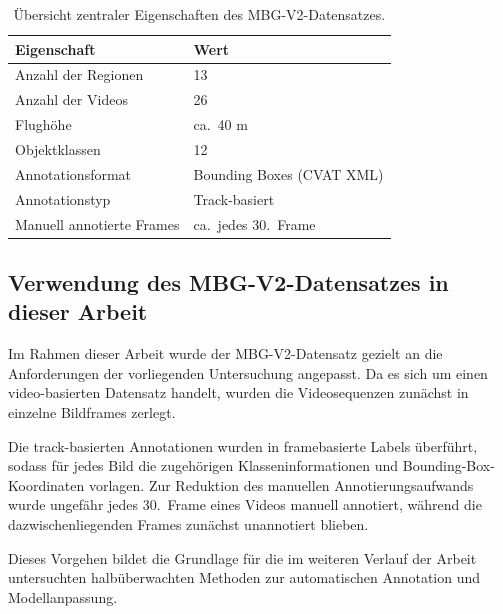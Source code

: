 \begin{table}[H]
    \centering
    \caption{Übersicht zentraler Eigenschaften des MBG-V2-Datensatzes.}
    \label{tab:mbgv2_overview}
    \begin{tabular}{ll}
        \toprule
        \textbf{Eigenschaft}      & \textbf{Wert}             \\
        \midrule
        Anzahl der Regionen       & 13                        \\
        Anzahl der Videos         & 26                        \\
        Flughöhe                  & ca.\ 40 m                 \\
        Objektklassen             & 12                        \\
        Annotationsformat         & Bounding Boxes (CVAT XML) \\
        Annotationstyp            & Track-basiert             \\
        Manuell annotierte Frames & ca.\ jedes 30.~Frame      \\
        \bottomrule
    \end{tabular}
\end{table}

\subsection{Verwendung des MBG-V2-Datensatzes in dieser Arbeit}

Im Rahmen dieser Arbeit wurde der MBG-V2-Datensatz gezielt an die Anforderungen
der vorliegenden Untersuchung angepasst. Da es sich um einen video-basierten
Datensatz handelt, wurden die Videosequenzen zunächst in einzelne Bildframes
zerlegt.

Die track-basierten Annotationen wurden in framebasierte Labels überführt,
sodass für jedes Bild die zugehörigen Klasseninformationen und
Bounding-Box-Koordinaten vorlagen. Zur Reduktion des manuellen
Annotierungsaufwands wurde ungefähr jedes 30.~Frame eines Videos manuell
annotiert, während die dazwischenliegenden Frames zunächst unannotiert blieben.

Dieses Vorgehen bildet die Grundlage für die im weiteren Verlauf der Arbeit
untersuchten halbüberwachten Methoden zur automatischen Annotation und
Modellanpassung.
